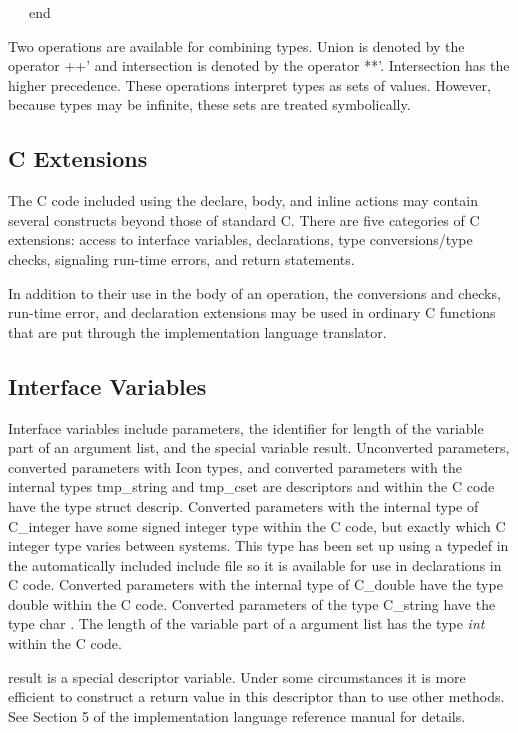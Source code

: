 {\ttfamily\mdseries
\ \ \ end}

Two operations are available for combining types. Union is denoted by
the operator {\textasciigrave}++' and intersection is denoted by the
operator {\textasciigrave}**'. Intersection has the higher
precedence. These operations interpret types as sets of
values. However, because types may be infinite, these sets are treated
symbolically.

\subsection{C Extensions}

The C code included using the declare, body, and inline actions may
contain several constructs beyond those of standard C. There are five
categories of C extensions: access to interface variables,
declarations, type conversions/type checks, signaling run-time errors,
and return statements.

In addition to their use in the body of an operation, the conversions
and checks, run-time error, and declaration extensions may be used in
ordinary C functions that are put through the implementation language
translator.

\subsection{Interface Variables}

Interface variables include parameters, the identifier for length of
the variable part of an argument list, and the special variable
result. Unconverted parameters, converted parameters with Icon types,
and converted parameters with the internal types tmp\_string and
tmp\_cset are descriptors and within the C code have the type struct
descrip.  Converted parameters with the internal type of C\_integer
have some signed integer type within the C code, but exactly which C
integer type varies between systems. This type has been set up using a
typedef in the automatically included include file so it is available
for use in declarations in C code. Converted parameters with the
internal type of C\_double have the type double within the C
code. Converted parameters of the type C\_string have the type char
. The length of the variable part of a argument list has the type
\textit{int} within the C code.

result is a special descriptor variable. Under some circumstances it
is more efficient to construct a return value in this descriptor than
to use other methods. See Section 5 of the implementation language
reference manual for details.

